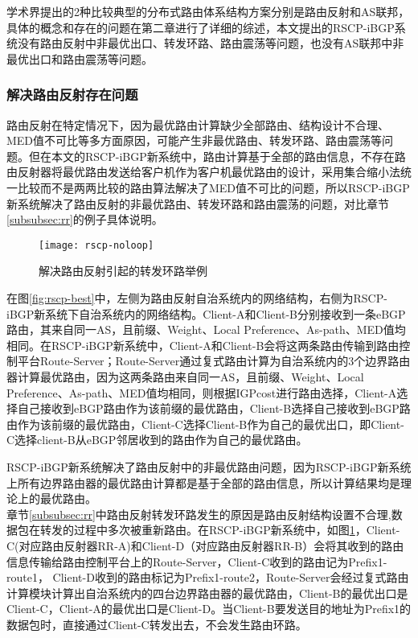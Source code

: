 学术界提出的2种比较典型的分布式路由体系结构方案分别是路由反射和AS联邦，具体的概念和存在的问题在第二章进行了详细的综述，本文提出的RSCP-iBGP系统没有路由反射中非最优出口、转发环路、路由震荡等问题，也没有AS联邦中非最优出口和路由震荡等问题。

\subsubsection{解决路由反射存在问题}



路由反射在特定情况下，因为最优路由计算缺少全部路由、结构设计不合理、MED值不可比等多方面原因，可能产生非最优路由、转发环路、路由震荡等问题。但在本文的RSCP-iBGP新系统中，路由计算基于全部的路由信息，不存在路由反射器将最优路由发送给客户机作为客户机最优路由的设计，采用集合缩小法统一比较而不是两两比较的路由算法解决了MED值不可比的问题，所以RSCP-iBGP新系统解决了路由反射的非最优路由、转发环路和路由震荡的问题，对比章节\ref{subsubsec:rr}的例子具体说明。\\

\begin{figure}
  \centering
  \texttt{[image: rscp-noloop]}
  \caption{解决路由反射引起的转发环路举例}
  \label{fig:rscp-noloop}
\end{figure}

在图\ref{fig:rscp-best}中，左侧为路由反射自治系统内的网络结构，右侧为RSCP-iBGP新系统下自治系统内的网络结构。Client-A和Client-B分别接收到一条eBGP路由，其来自同一AS，且前缀、Weight、Local Preference、As-path、MED值均相同。在RSCP-iBGP新系统中，Client-A和Client-B会将这两条路由传输到路由控制平台Route-Server；Route-Server通过复式路由计算为自治系统内的3个边界路由器计算最优路由，因为这两条路由来自同一AS，且前缀、Weight、Local Preference、As-path、MED值均相同，则根据IGPcost进行路由选择，Client-A选择自己接收到eBGP路由作为该前缀的最优路由，Client-B选择自己接收到eBGP路由作为该前缀的最优路由，Client-C选择Client-B作为自己的最优出口，即Client-C选择client-B从eBGP邻居收到的路由作为自己的最优路由。

RSCP-iBGP新系统解决了路由反射中的非最优路由问题，因为RSCP-iBGP新系统上所有边界路由器的最优路由计算都是基于全部的路由信息，所以计算结果均是理论上的最优路由。\\




章节\ref{subsubsec:rr}中路由反射转发环路发生的原因是路由反射结构设置不合理,数据包在转发的过程中多次被重新路由。在RSCP-iBGP新系统中，如图\ref{fig:rscp-noloop}，Client-C(对应路由反射器RR-A)和Client-D（对应路由反射器RR-B）会将其收到的路由信息传输给路由控制平台上的Route-Server，Client-C收到的路由记为Prefix1-route1， Client-D收到的路由标记为Prefix1-route2，Route-Server会经过复式路由计算模块计算出自治系统内的四台边界路由器的最优路由，Client-B的最优出口是Client-C，Client-A的最优出口是Client-D。当Client-B要发送目的地址为Prefix1的数据包时，直接通过Client-C转发出去，不会发生路由环路。\\

